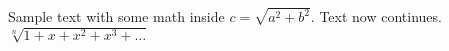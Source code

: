 \documentclass[12pt]{article}
\begin{document}
Sample text with some math inside \(c=\sqrt{a^2+b^2}\). Text now continues. \(\sqrt[n]{1+x+x^2+x^3+\ldots}\)
\end{document}
